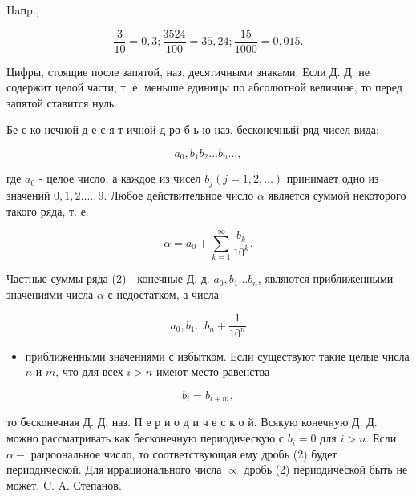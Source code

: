 \documentclass[10pt]{article}
\begin{document}
Haпp.,



\[

\frac{3}{10}=0,3 ; \frac{3524}{100}=35,24 ; \frac{15}{1000}=0,015 .

\]



Цифры, стоящие после запятой, наз. десятичными знаками. Если Д. Д. не содержит целой части, т. е. меныше единицы по абсолютной величине, то перед запятой ставится нуль.



Бе с ко нечной д е с я т ичной д ро б ь ю наз. бесконечный ряд чисел вида:



\[

a_{0}, b_{1} b_{2} \ldots b_{n} \ldots,

\]



где $a_{0}$ - целое число, а каждое из чисел $b_{j}(j=1,2, \ldots)$ принимает одно из значений $0,1,2 . \ldots, 9$. Любое действительное число $\alpha$ является суммой некоторого такого ряда, т. е.



\[

\alpha=a_{0}+\sum_{k=1}^{\infty} \frac{b_{k}}{10^{k}} .

\]



Частные суммы ряда (2) - конечные Д. д. $a_{0}, b_{1} \ldots b_{n}$, являются приближенными значениями числа $\alpha$ с недостатком, а числа



\[

a_{0}, b_{1} \ldots b_{n}+\frac{1}{10^{n}}

\]



\begin{itemize}

  \item приближенными значениями с избытком. Если существуют такие целые числа $n$ и $m$, что для всех $i>n$ имеют место равенства

\end{itemize}



\[

b_{i}=b_{i+m},

\]



то бесконечная Д. Д. наз. П е р и о д и ч е с к о й. Всякую конечную Д. Д. можно рассматривать как бесконечную периодическую с $b_{i}=0$ для $i>n$. Если $\alpha-$ рацюональное число, то соответствующая ему дробь (2) будет периодической. Для иррационального числа $\propto$ дробь (2) периодической быть не может. C. A. Степанов.
\end{document}
